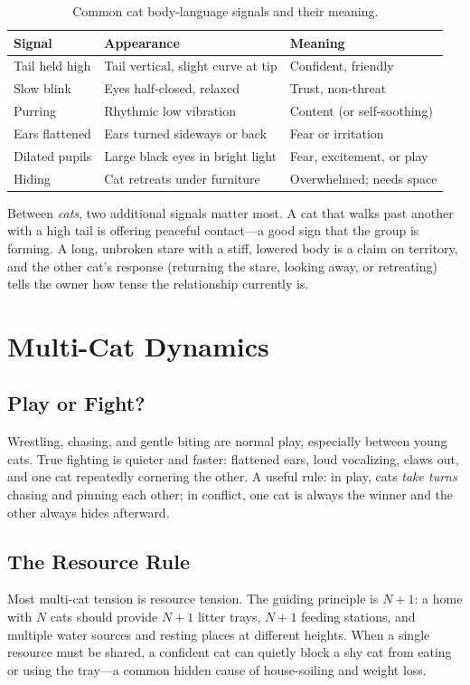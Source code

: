 \documentclass[12pt,a4paper]{article}
\begin{document}
\begin{table}[h]
\centering
\caption{Common cat body-language signals and their meaning.}
\label{tab:body}
\begin{tabular}{@{}lll@{}}
\toprule
\textbf{Signal} & \textbf{Appearance} & \textbf{Meaning} \\
\midrule
Tail held high & Tail vertical, slight curve at tip & Confident, friendly \\
Slow blink & Eyes half-closed, relaxed & Trust, non-threat \\
Purring & Rhythmic low vibration & Content (or self-soothing) \\
Ears flattened & Ears turned sideways or back & Fear or irritation \\
Dilated pupils & Large black eyes in bright light & Fear, excitement, or play \\
Hiding & Cat retreats under furniture & Overwhelmed; needs space \\
\bottomrule
\end{tabular}
\end{table}

Between \emph{cats}, two additional signals matter most. A cat that walks past another
with a high tail is offering peaceful contact---a good sign that the group is forming.
A long, unbroken stare with a stiff, lowered body is a claim on territory, and the
other cat's response (returning the stare, looking away, or retreating) tells the owner
how tense the relationship currently is.

\section{Multi-Cat Dynamics}
\label{sec:dynamics}
\subsection{Play or Fight?}
Wrestling, chasing, and gentle biting are normal play, especially between young cats.
True fighting is quieter and faster: flattened ears, loud vocalizing, claws out, and
one cat repeatedly cornering the other. A useful rule: in play, cats \emph{take turns}
chasing and pinning each other; in conflict, one cat is always the winner and the other
always hides afterward.

\subsection{The Resource Rule}
Most multi-cat tension is resource tension. The guiding principle is
\emph{$N + 1$}: a home with $N$ cats should provide $N + 1$ litter trays, $N + 1$
feeding stations, and multiple water sources and resting places at different heights.
When a single resource must be shared, a confident cat can quietly block a shy cat from
eating or using the tray---a common hidden cause of house-soiling and weight loss.
\end{document}

